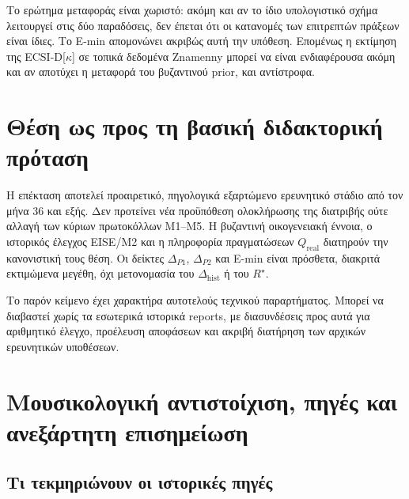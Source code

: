 \documentclass[
  10pt,
  a4paper,
]{report}
\begin{document}
Το ερώτημα μεταφοράς είναι χωριστό: ακόμη και αν το ίδιο υπολογιστικό
σχήμα λειτουργεί στις δύο παραδόσεις, δεν έπεται ότι οι κατανομές των
επιτρεπτών πράξεων είναι ίδιες. Το E-min απομονώνει ακριβώς αυτή την
υπόθεση. Επομένως η εκτίμηση της ECSI-D{[}\(\kappa\){]} σε τοπικά
δεδομένα Znamenny μπορεί να είναι ενδιαφέρουσα ακόμη και αν αποτύχει η
μεταφορά του βυζαντινού prior, και αντίστροφα.

\chapter{Θέση ως προς τη βασική διδακτορική
πρόταση}\label{ux3b8ux3adux3c3ux3b7-ux3c9ux3c2-ux3c0ux3c1ux3bfux3c2-ux3c4ux3b7-ux3b2ux3b1ux3c3ux3b9ux3baux3ae-ux3b4ux3b9ux3b4ux3b1ux3baux3c4ux3bfux3c1ux3b9ux3baux3ae-ux3c0ux3c1ux3ccux3c4ux3b1ux3c3ux3b7}

Η επέκταση αποτελεί προαιρετικό, πηγολογικά εξαρτώμενο ερευνητικό στάδιο
από τον μήνα 36 και εξής. Δεν προτείνει νέα προϋπόθεση ολοκλήρωσης της
διατριβής ούτε αλλαγή των κύριων πρωτοκόλλων Μ1--Μ5. Η βυζαντινή
οικογενειακή έννοια, ο ιστορικός έλεγχος EISE/Μ2 και η πληροφορία
πραγματώσεων \(Q_{\mathrm{real}}\) διατηρούν την κανονιστική τους θέση.
Οι δείκτες \(\Delta_{P1}\), \(\Delta_{P2}\) και E-min είναι πρόσθετα,
διακριτά εκτιμώμενα μεγέθη, όχι μετονομασία του
\(\Delta_{\mathrm{hist}}\) ή του \(R^\star\).

Το παρόν κείμενο έχει χαρακτήρα αυτοτελούς τεχνικού παραρτήματος. Μπορεί
να διαβαστεί χωρίς τα εσωτερικά ιστορικά reports, με διασυνδέσεις προς
αυτά για αριθμητικό έλεγχο, προέλευση αποφάσεων και ακριβή διατήρηση των
αρχικών ερευνητικών υποθέσεων.

\chapter{Μουσικολογική αντιστοίχιση, πηγές και ανεξάρτητη
επισημείωση}\label{ux3bcux3bfux3c5ux3c3ux3b9ux3baux3bfux3bbux3bfux3b3ux3b9ux3baux3ae-ux3b1ux3bdux3c4ux3b9ux3c3ux3c4ux3bfux3afux3c7ux3b9ux3c3ux3b7-ux3c0ux3b7ux3b3ux3adux3c2-ux3baux3b1ux3b9-ux3b1ux3bdux3b5ux3beux3acux3c1ux3c4ux3b7ux3c4ux3b7-ux3b5ux3c0ux3b9ux3c3ux3b7ux3bcux3b5ux3afux3c9ux3c3ux3b7}

\section{Τι τεκμηριώνουν οι ιστορικές
πηγές}\label{ux3c4ux3b9-ux3c4ux3b5ux3baux3bcux3b7ux3c1ux3b9ux3ceux3bdux3bfux3c5ux3bd-ux3bfux3b9-ux3b9ux3c3ux3c4ux3bfux3c1ux3b9ux3baux3adux3c2-ux3c0ux3b7ux3b3ux3adux3c2}
\end{document}
